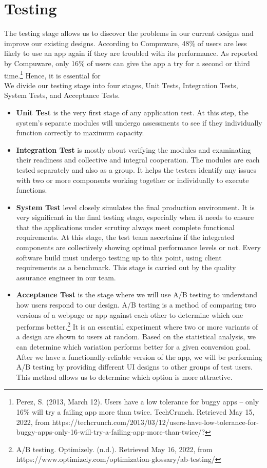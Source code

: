 \section{Testing}
\label{ch2test}
The testing stage allows us to discover the problems in our current designs and improve our existing designs. 
According to Compuware, 48\% of users are less likely to use an app again if they are troubled with its performance.
As reported by Compuware, only 16\% of users can give the app a try for a second or third time.\footnote{Perez, S. (2013, March 12). Users have a low tolerance for buggy apps – only 16\% will try a failing app more than twice. TechCrunch. Retrieved May 15, 2022, from https://techcrunch.com/2013/03/12/users-have-low-tolerance-for-buggy-apps-only-16-will-try-a-failing-app-more-than-twice/?} Hence, it is essential for 
\\We divide our testing stage into four stages, Unit Tests, Integration Tests, System Tests, and Acceptance Tests.
\begin{itemize}
\item\textbf{Unit Test} is the very first stage of any application test. At this step, the system’s separate modules will undergo assessments to see if they individually function correctly to maximum capacity. 
\item\textbf{Integration Test} is mostly about verifying the modules and examinating their readiness and collective and integral cooperation. The modules are each tested separately and also as a group. It helps the testers identify any issues with two or more components working together or individually to execute functions.
\item\textbf{System Test} level closely simulates the final production environment. It is very significant in the final testing stage, especially when it needs to ensure that the applications under scrutiny always meet complete functional requirements. 
At this stage, the test team ascertains if the integrated components are collectively showing optimal performance levels or not. Every software build must undergo testing up to this point, using client requirements as a benchmark. This stage is carried out by the quality assurance engineer in our team.
\item\textbf{Acceptance Test} is the stage where we will use A/B testing to understand how users respond to our design. 
A/B testing is a method of comparing two versions of a webpage or app against each other to determine which one performs better.\footnote{A/B testing. Optimizely. (n.d.). Retrieved May 16, 2022, from https://www.optimizely.com/optimization-glossary/ab-testing/} It is an essential experiment where two or more variants of a design are shown to users at random. Based on the statistical analysis, we can determine which variation performs better for a given conversion goal.
After we have a functionally-reliable version of the app, 
we will be performing A/B testing by providing different UI designs to other groups of test users. This method allows us to 
determine which option is more attractive.\end{itemize}

